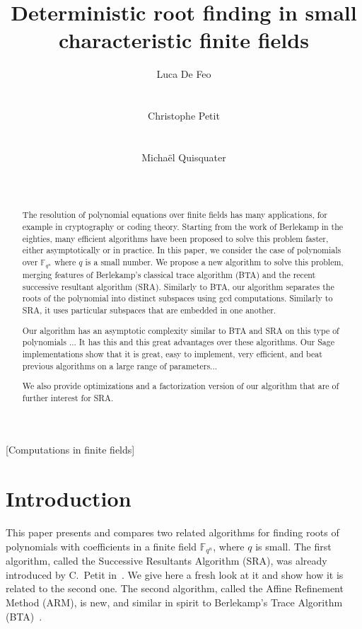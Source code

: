\documentclass{sig-alternate}
\author{
  \alignauthor Luca De Feo\\
  \affaddr{Laboratoire PRiSM}\\
  \affaddr{Universit\'e de Versailles}\\
  \email{luca.de-feo@uvsq.fr}
  \alignauthor Christophe Petit\\
  \affaddr{Crypto Group}\\
  \affaddr{University College London}\\
  \email{}
  \alignauthor Micha\"el Quisquater\\
  \affaddr{Laboratoire PRiSM}\\
  \affaddr{Universit\'e de Versailles}\\
  \email{mquis@prism.uvsq.fr}
}
\title{Deterministic root finding in small characteristic finite
  fields}
\newcommand{\ff}[1]{\mathbb{F}_{#1}}
\newcommand{\fqn}{\ff{q^n}}
\newcommand{\qq}{q}
\newcommand{\nn}{n}
\newcommand{\qn}{{\qq^\nn}}
\newcommand{\extf}{\ff{\qn}}
\newcounter{algo}
\begin{document}
\maketitle
\begin{abstract}
  The resolution of polynomial equations over finite fields has many
  applications, for example in cryptography or coding theory. Starting
  from the work of Berlekamp in the eighties, many efficient
  algorithms have been proposed to solve this problem faster, either
  asymptotically or in practice.  In this paper, we consider the case
  of polynomials over $\fqn$ where $\qq$ is a small number. We propose a
  new algorithm to solve this problem, merging features of Berlekamp's
  classical trace algorithm (BTA) and the recent successive resultant
  algorithm (SRA).  Similarly to BTA, our algorithm separates the
  roots of the polynomial into distinct subspaces using gcd
  computations. Similarly to SRA, it uses particular subspaces that
  are embedded in one another.

  Our algorithm has an asymptotic complexity similar to BTA and SRA on
  this type of polynomials ... It has this and this great advantages
  over these algorithms. Our Sage implementations show that it is
  great, easy to implement, very efficient, and beat previous
  algorithms on a large range of parameters...

  We also provide optimizations and a factorization version of our
  algorithm that are of further interest for SRA.
\end{abstract}

[Computations in finite fields]


\section{Introduction}

This paper presents and compares two related algorithms for finding
roots of polynomials with coefficients in a finite field $\extf$,
where $\qq$ is small. The first algorithm, called the Successive
Resultants Algorithm (SRA), was already introduced by C.~Petit
in~\cite{cgUCL-P14}. We give here a fresh look at it and show how it
is related to the second one. The second algorithm, called the Affine
Refinement Method (ARM), is new, and similar in spirit to Berlekamp's
Trace Algorithm (BTA)~\cite{berl70}.
\end{document}

